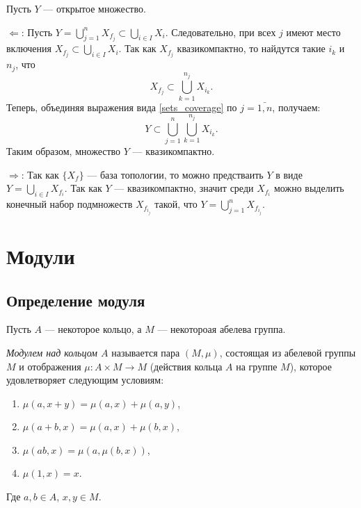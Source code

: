     \begin{Proof}
        Пусть $Y$ --- открытое множество.

        $\Leftarrow$: Пусть $Y = \bigcup_{j = 1}^n X_{f_j} \subset \bigcup_{i \in I} X_i$. Следовательно, при всех $j$ имеют место включения
        $X_{f_j} \subset \bigcup_{i \in I}X_i$. Так как $X_{f_j}$ квазикомпактно, то найдутся такие $i_k$ и $n_j$, что 
        \begin{equation} \label{sets_coverage}
            X_{f_j} \subset \bigcup_{k = 1}^{n_j} X_{i_k}.
        \end{equation}
        Теперь, объединяя выражения вида \eqref{sets_coverage} по $j = \bar{1, n}$, получаем:
        $$
            Y \subset \bigcup_{j = 1}^n \bigcup_{k = 1}^{n_j} X_{i_k}.
        $$
        Таким образом, множество $Y$ --- квазикомпактно.

        $\Rightarrow$: Так как $\{X_f\}$ --- база топологии, то можно предстваить $Y$ в виде $Y = \bigcup_{i \in I} X_{f_i}$. Так как $Y$ --- квазикомпактно, значит среди $X_{f_i}$ можно выделить конечный набор подмножеств 
         $X_{f_{i_j}}$ такой, что $Y = \bigcup_{j = 1}^n X_{f_{i_j}}$.
    \end{Proof}

    \section{Модули}

    \subsection{Определение модуля}

    Пусть $A$ --- некоторое кольцо, а $M$ --- некотороая абелева группа. 
    \begin{Def}
        \textit{Модулем над кольцом $A$} называется пара $(M, \mu)$, состоящая из абелевой группы $M$ и отображения $\mu : A \times M \rightarrow M$ (действия кольца $A$ на группе $M$), 
        которое удовлетворяет следующим условиям:
        \begin{enumerate}
            \item $\mu(a, x + y) = \mu(a, x) + \mu(a, y)$,
            \item $\mu(a + b, x) = \mu(a, x) + \mu(b, x)$,
            \item $\mu(ab, x) = \mu(a, \mu(b, x))$,
            \item $\mu(1, x) = x$.
        \end{enumerate}
        Где $a, b \in A$, $x, y \in M$.
    \end{Def}

